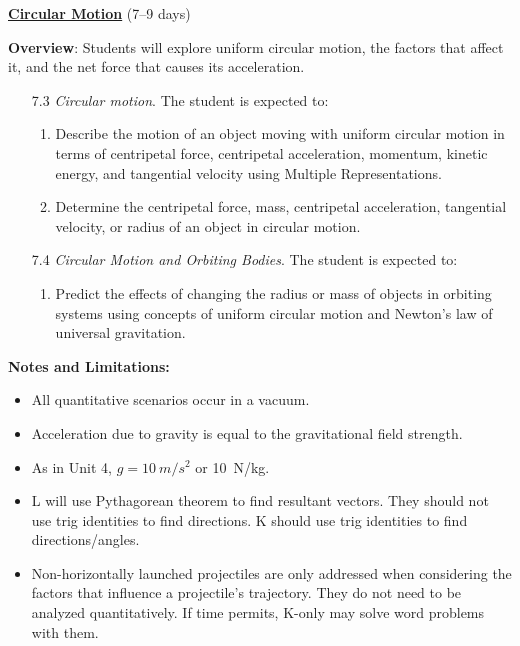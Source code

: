 \documentclass[dvipsnames]{article}
\begin{document}
\textbf{\underline{Circular Motion}} (7--9 days)

\textbf{Overview}: Students will explore uniform circular motion, the factors that affect it, and the net force that causes its acceleration.

\begin{enumerate}
    \item[7.3] \textit{Circular motion}. The student is expected to:
    \begin{enumerate}
        \item Describe the motion of an object moving with uniform circular motion in terms of centripetal force, centripetal acceleration, momentum, kinetic energy, and tangential velocity using Multiple Representations.
        \item Determine the centripetal force, mass, centripetal acceleration, tangential velocity, or radius of an object in circular motion.
    \end{enumerate}
    \item[7.4] \textit{Circular Motion and Orbiting Bodies}. The student is expected to:
    \begin{enumerate}
        \item Predict the effects of changing the radius or mass of objects in orbiting systems using concepts of uniform circular motion and Newton's law of universal gravitation.
    \end{enumerate}
\end{enumerate}

\textbf{Notes and Limitations:}

\begin{itemize}[itemsep=0pt,topsep=-3pt]
    \item All quantitative scenarios occur in a vacuum.
    \item Acceleration due to gravity is equal to the gravitational field strength.  
    \item As in Unit 4, $g = \SI{10}{m/s^2}$ or \SI{10}{N/kg}.
    \item L will use Pythagorean theorem to find resultant vectors. They should not use trig identities to find directions. K should use trig identities to find directions/angles.
    \item Non-horizontally launched projectiles are only addressed when considering the factors that influence a projectile's trajectory. They do not need to be analyzed quantitatively. If time permits, K-only may solve word problems with them.
\end{itemize}
\end{document}
